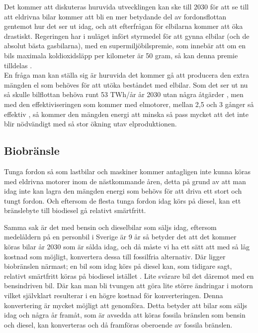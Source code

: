 \documentclass[a4paper,11pt,fleqn, titlepage]{article}
\begin{document}
Det kommer att diskuteras huruvida
utvecklingen kan ske till 2030 för att se till att eldrivna bilar kommer
att bli en mer betydande del av fordonsflottan gentemot hur det ser ut
idag, och att efterfrågan för elbilarna kommer att öka drastiskt.
Regeringen har i nuläget infört styrmedel för att gynna elbilar
(och de absolut bästa gasbilarna), med en supermiljöbilspremie, som innebär
att om en bils maximala koldioxidsläpp per kilometer är 50 gram, så kan denna
premie tilldelas \cite{ekonomiskastyrmedel}.\\

En fråga man kan ställa sig är huruvida det kommer gå att producera den
extra mängden el som behöves för att utöka beståndet med elbilar. Som det
ser ut nu så skulle bilflottan behöva runt 53 TWh/år år 2030 utan några
åtgärder \cite[s.~24]{elforsk}, men med
den effektiviseringen som kommer med elmotorer, mellan 2,5 och 3 gånger så
effektiv \cite[s.~29]{elforsk}, så kommer den
mängden energi att minska så pass mycket att det inte blir nödvändigt med
så stor ökning utav elproduktionen.

\subsection{Biobränsle}
Tunga fordon så som lastbilar och maskiner kommer antagligen inte kunna
köras med eldrivna motorer inom de nästkommande åren, detta på grund av att
man idag inte kan lagra den mängden energi som behövs för att driva ett
stort och tungt fordon. Och eftersom de flesta tunga fordon idag körs på
diesel, kan ett bränslebyte till biodiesel gå relativt smärtfritt.

Samma sak är det med bensin och dieselbilar som säljs idag, eftersom
medelåldern på en personbil i Sverige är 9 år \cite[s.~17]{elforsk} så
betyder det att det kommer köras bilar år 2030 som är sålda idag,
och då måste vi ha ett sätt att med så låg kostnad som möjligt, konvertera
dessa till fossilfria alternativ. Där ligger biobränslen närmast; en bil
som idag körs på diesel kan, som tidigare sagt, relativt smärtfritt köras
på biodiesel istället \cite{statoil}. Lite
svårare bil det däremot med en bensindriven bil. Där kan man bli tvungen
att göra lite större ändringar i motorn vilket självklart resulterar i en
högre kostnad för konverteringen. Denna konvertering är mycket möjligt att genomföra.
Detta betyder att bilar som säljs idag och några år framåt,
som är avsedda att köras fossila bränslen som bensin och diesel, kan
konverteras och då framföras oberoende av fossila bränslen.
\end{document}
